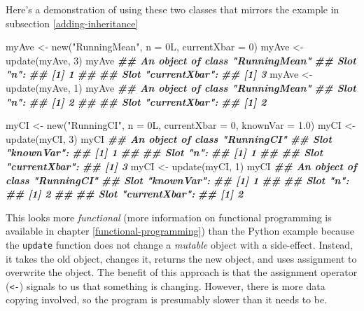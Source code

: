 \documentclass[
  12pt,
]{krantz}
\makeatletter
\newenvironment{Shaded}{\begin{snugshade}}{\end{snugshade}}
\newcommand{\AttributeTok}[1]{\textcolor[rgb]{0.61,0.61,0.61}{#1}}
\newcommand{\DecValTok}[1]{\textcolor[rgb]{0.06,0.06,0.06}{#1}}
\newcommand{\DocumentationTok}[1]{\textcolor[rgb]{0.37,0.37,0.37}{\textbf{\textit{#1}}}}
\newcommand{\FloatTok}[1]{\textcolor[rgb]{0.06,0.06,0.06}{#1}}
\newcommand{\FunctionTok}[1]{\textcolor[rgb]{0,0,0}{#1}}
\newcommand{\NormalTok}[1]{#1}
\newcommand{\OtherTok}[1]{\textcolor[rgb]{0.37,0.37,0.37}{#1}}
\newcommand{\StringTok}[1]{\textcolor[rgb]{0.5,0.5,0.5}{#1}}
\newenvironment{kframe}{%
\medskip{}
\setlength{\fboxsep}{.8em}
 \def\at@end@of@kframe{}%
 \ifinner\ifhmode%
  \def\at@end@of@kframe{\end{minipage}}%
  \begin{minipage}{\columnwidth}%
 \fi\fi%
 \def\FrameCommand##1{\hskip\@totalleftmargin \hskip-\fboxsep
 \colorbox{shadecolor}{##1}\hskip-\fboxsep
     \hskip-\linewidth \hskip-\@totalleftmargin \hskip\columnwidth}%
 \MakeFramed {\advance\hsize-\width
   \@totalleftmargin\z@ \linewidth\hsize
   \@setminipage}}%
 {\par\unskip\endMakeFramed%
 \at@end@of@kframe}
\renewenvironment{Shaded}{\begin{kframe}}{\end{kframe}}
\makeatother
\begin{document}
Here's a demonstration of using these two classes that mirrors the example in subsection \ref{adding-inheritance}

\begin{Shaded}
\begin{Highlighting}[]
\NormalTok{myAve }\OtherTok{\textless{}{-}} \FunctionTok{new}\NormalTok{(}\StringTok{"RunningMean"}\NormalTok{, }\AttributeTok{n =}\NormalTok{ 0L, }\AttributeTok{currentXbar =} \DecValTok{0}\NormalTok{)}
\NormalTok{myAve }\OtherTok{\textless{}{-}} \FunctionTok{update}\NormalTok{(myAve, }\DecValTok{3}\NormalTok{)}
\NormalTok{myAve}
\DocumentationTok{\#\# An object of class "RunningMean"}
\DocumentationTok{\#\# Slot "n":}
\DocumentationTok{\#\# [1] 1}
\DocumentationTok{\#\# }
\DocumentationTok{\#\# Slot "currentXbar":}
\DocumentationTok{\#\# [1] 3}
\NormalTok{myAve }\OtherTok{\textless{}{-}} \FunctionTok{update}\NormalTok{(myAve, }\DecValTok{1}\NormalTok{)}
\NormalTok{myAve}
\DocumentationTok{\#\# An object of class "RunningMean"}
\DocumentationTok{\#\# Slot "n":}
\DocumentationTok{\#\# [1] 2}
\DocumentationTok{\#\# }
\DocumentationTok{\#\# Slot "currentXbar":}
\DocumentationTok{\#\# [1] 2}

\NormalTok{myCI }\OtherTok{\textless{}{-}} \FunctionTok{new}\NormalTok{(}\StringTok{"RunningCI"}\NormalTok{, }\AttributeTok{n =}\NormalTok{ 0L, }\AttributeTok{currentXbar =} \DecValTok{0}\NormalTok{, }\AttributeTok{knownVar =} \FloatTok{1.0}\NormalTok{)}
\NormalTok{myCI }\OtherTok{\textless{}{-}} \FunctionTok{update}\NormalTok{(myCI, }\DecValTok{3}\NormalTok{)}
\NormalTok{myCI}
\DocumentationTok{\#\# An object of class "RunningCI"}
\DocumentationTok{\#\# Slot "knownVar":}
\DocumentationTok{\#\# [1] 1}
\DocumentationTok{\#\# }
\DocumentationTok{\#\# Slot "n":}
\DocumentationTok{\#\# [1] 1}
\DocumentationTok{\#\# }
\DocumentationTok{\#\# Slot "currentXbar":}
\DocumentationTok{\#\# [1] 3}
\NormalTok{myCI }\OtherTok{\textless{}{-}} \FunctionTok{update}\NormalTok{(myCI, }\DecValTok{1}\NormalTok{)}
\NormalTok{myCI}
\DocumentationTok{\#\# An object of class "RunningCI"}
\DocumentationTok{\#\# Slot "knownVar":}
\DocumentationTok{\#\# [1] 1}
\DocumentationTok{\#\# }
\DocumentationTok{\#\# Slot "n":}
\DocumentationTok{\#\# [1] 2}
\DocumentationTok{\#\# }
\DocumentationTok{\#\# Slot "currentXbar":}
\DocumentationTok{\#\# [1] 2}
\end{Highlighting}
\end{Shaded}

This looks more \emph{functional} (more information on functional programming is available in chapter \ref{functional-programming}) than the Python example because the \texttt{update} function does not change a \emph{mutable} object with a side-effect. Instead, it takes the old object, changes it, returns the new object, and uses assignment to overwrite the object. The benefit of this approach is that the assignment operator (\texttt{\textless{}-}) signals to us that something is changing. However, there is more data copying involved, so the program is presumably slower than it needs to be.
\end{document}
